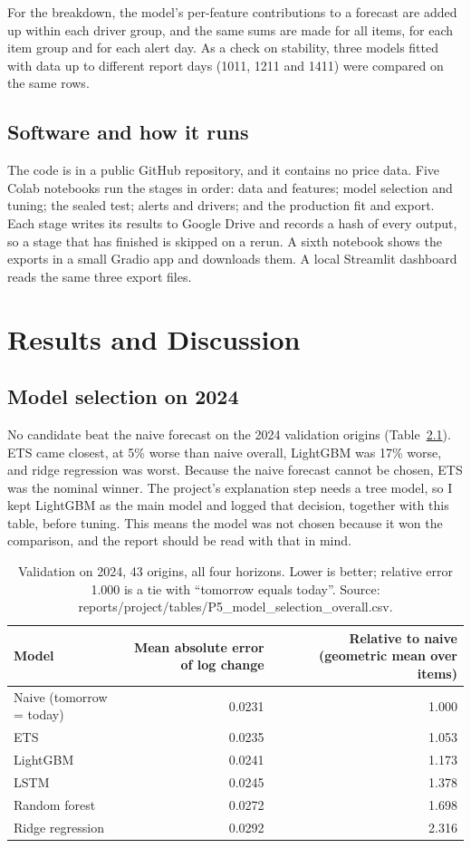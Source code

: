 \documentclass[12pt]{report}
\begin{document}
For the breakdown, the model's per-feature contributions to a forecast are added up within each driver group, and the same sums are made for all items, for each item group and for each alert day. As a check on stability, three models fitted with data up to different report days (1011, 1211 and 1411) were compared on the same rows.

\section{Software and how it runs}
The code is in a public GitHub repository, and it contains no price data. Five Colab notebooks run the stages in order: data and features; model selection and tuning; the sealed test; alerts and drivers; and the production fit and export. Each stage writes its results to Google Drive and records a hash of every output, so a stage that has finished is skipped on a rerun. A sixth notebook shows the exports in a small Gradio app and downloads them. A local Streamlit dashboard reads the same three export files.

\chapter{Results and Discussion}

\section{Model selection on 2024}
No candidate beat the naive forecast on the 2024 validation origins (Table~\ref{tab:select}). ETS came closest, at 5\% worse than naive overall, LightGBM was 17\% worse, and ridge regression was worst. Because the naive forecast cannot be chosen, ETS was the nominal winner. The project's explanation step needs a tree model, so I kept LightGBM as the main model and logged that decision, together with this table, before tuning. This means the model was not chosen because it won the comparison, and the report should be read with that in mind.

\begin{table}[H]\centering\small
\caption{Validation on 2024, 43 origins, all four horizons. Lower is better; relative error 1.000 is a tie with ``tomorrow equals today''. Source: reports/project/tables/P5\_model\_selection\_overall.csv.}\label{tab:select}
\begin{tabular}{lrr}
\toprule
Model & Mean absolute error of log change & Relative to naive (geometric mean over items) \\
\midrule
Naive (tomorrow = today) & 0.0231 & 1.000 \\
ETS & 0.0235 & 1.053 \\
LightGBM & 0.0241 & 1.173 \\
LSTM & 0.0245 & 1.378 \\
Random forest & 0.0272 & 1.698 \\
Ridge regression & 0.0292 & 2.316 \\
\bottomrule
\end{tabular}
\end{table}
\end{document}
